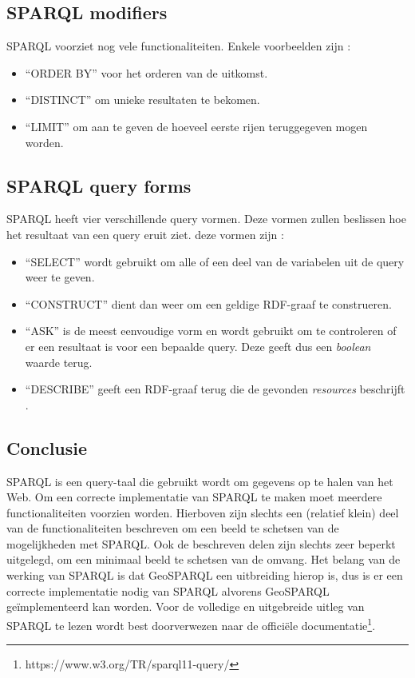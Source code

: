 \subsection{SPARQL modifiers}
SPARQL voorziet nog vele functionaliteiten. Enkele voorbeelden zijn \cite{sparql2013querylanguage}:
\begin{itemize}
    \item ``ORDER BY'' voor het orderen van de uitkomst.
    \item ``DISTINCT'' om unieke resultaten te bekomen.
    \item ``LIMIT'' om aan te geven de hoeveel eerste rijen teruggegeven mogen worden.
\end{itemize}

\subsection{SPARQL query forms}
SPARQL heeft vier verschillende query vormen. Deze vormen zullen beslissen hoe het resultaat van een query eruit ziet. deze vormen zijn \cite{sparql2013querylanguage}:
\begin{itemize}
    \item ``SELECT'' wordt gebruikt om alle of een deel van de variabelen uit de query weer te geven.
    \item ``CONSTRUCT'' dient dan weer om een geldige RDF-graaf te construeren.
    \item ``ASK'' is de meest eenvoudige vorm en wordt gebruikt om te controleren of er een resultaat is voor een bepaalde query. Deze geeft dus een \textit{boolean} waarde terug.
    \item ``DESCRIBE'' geeft een RDF-graaf terug die de gevonden \textit{resources} beschrijft .
\end{itemize}

\subsection{Conclusie}
SPARQL is een query-taal die gebruikt wordt om gegevens op te halen van het Web. Om een correcte implementatie van SPARQL te maken moet meerdere functionaliteiten voorzien worden. Hierboven zijn slechts een (relatief klein) deel van de functionaliteiten beschreven om een beeld te schetsen van de mogelijkheden met SPARQL. Ook de beschreven delen zijn slechts zeer beperkt uitgelegd, om een minimaal beeld te schetsen van de omvang. Het belang van de werking van SPARQL is dat GeoSPARQL een uitbreiding hierop is, dus is er een correcte implementatie nodig van SPARQL alvorens GeoSPARQL geïmplementeerd kan worden. Voor de volledige en uitgebreide uitleg van SPARQL te lezen wordt best doorverwezen naar de officiële documentatie\footnote{https://www.w3.org/TR/sparql11-query/}.